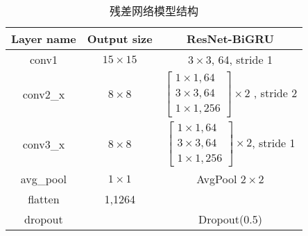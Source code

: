 \begin{table}[h]
	\caption{残差网络模型结构}
	\label{tab:resnet_description}
	\centering
	\begin{tabular}{c|c|c}
		\hline
		Layer name                & Output size                              & ResNet-BiGRU             \\
		\hline
		conv1                     & $15 \times 15$                           & $3\times3$, 64, stride 1 \\
		\hline
		\multirow{4}{*}{conv2\_x} & \multirow{4}{*}{\centering $8 \times 8$} &
		\multirow{4}{*}{$\left[\begin{array}{c}
						                       1 \times 1, 64 \\
						                       3 \times 3, 64 \\
						                       1 \times 1, 256
					                       \end{array}\right] \times 2$ , stride 2}                                 \\
		                          &                                          &                          \\
		                          &                                          &                          \\
		                          &                                          &                          \\
		\hline
		\multirow{4}{*}{conv3\_x} & \multirow{4}{*}{\centering $8 \times 8$} &
		\multirow{4}{*}{$\left[\begin{array}{c}
						                       1 \times 1, 64 \\
						                       3 \times 3, 64 \\
						                       1 \times 1, 256
					                       \end{array}\right] \times 2$, stride 1}                                  \\
		                          &                                          &                          \\
		                          &                                          &                          \\
		                          &                                          &                          \\
		\hline
		avg\_pool                 & $1 \times 1$                             & AvgPool $2 \times 2$     \\
		\hline
		flatten                   & 1,1264                                   &                          \\
		\hline
		dropout                   &                                          & Dropout(0.5)             \\
		\hline
	\end{tabular}
\end{table}



